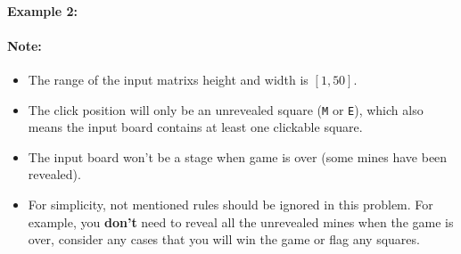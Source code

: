 \paragraph{Example 2:}


\paragraph{Note:}

\begin{itemize}
\item The range of the input matrixs height and width is $ [1,50] $.
\item The click position will only be an unrevealed square (\texttt{M} or \texttt{E}), which also means the input board contains at least one clickable square.
\item The input board won't be a stage when game is over (some mines have been revealed).
\item For simplicity, not mentioned rules should be ignored in this problem. For example, you \textbf{don't} need to reveal all the unrevealed mines when the game is over, consider any cases that you will win the game or flag any squares.
\end{itemize}
